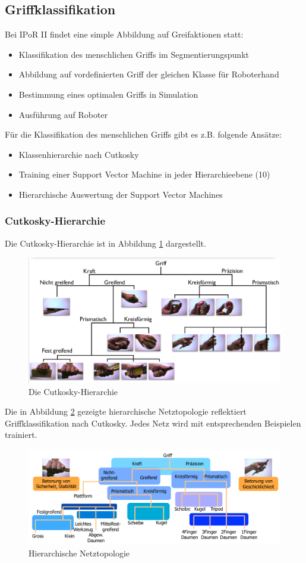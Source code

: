 \subsection{Griffklassifikation}
Bei IPoR II findet eine simple Abbildung auf Greifaktionen statt:
\begin{itemize}
\item Klassifikation des menschlichen Griffs im Segmentierungspunkt
\item Abbildung auf vordefinierten Griff der gleichen Klasse für Roboterhand
\item Bestimmung eines optimalen Griffs in Simulation
\item Ausführung auf Roboter
\end{itemize}
Für die Klassifikation des menschlichen Griffs gibt es z.B. folgende Ansätze:
\begin{itemize}
\item Klassenhierarchie nach Cutkosky
\item Training einer Support Vector Machine in jeder Hierarchieebene (10)
\item Hierarchische Auswertung der Support Vector Machines
\end{itemize}
\subsubsection*{Cutkosky-Hierarchie}
Die Cutkosky-Hierarchie ist in Abbildung \ref{fig:ch04_cuthie} dargestellt.
\begin{figure}[ht]\centering 
\includegraphics[width=0.6\linewidth]{figures/ch04_cutkosky.png}
\caption{Die Cutkosky-Hierarchie}
\label{fig:ch04_cuthie}
\end{figure}
Die in Abbildung \ref{fig:ch04_netztopo} gezeigte hierarchische Netztopologie reflektiert Griffklassifikation nach Cutkosky. Jedes Netz wird mit entsprechenden Beispielen trainiert.
\begin{figure}[ht]\centering 
\includegraphics[width=0.6\linewidth]{figures/ch04_netztopo.png}
\caption{Hierarchische Netztopologie}
\label{fig:ch04_netztopo}
\end{figure}
